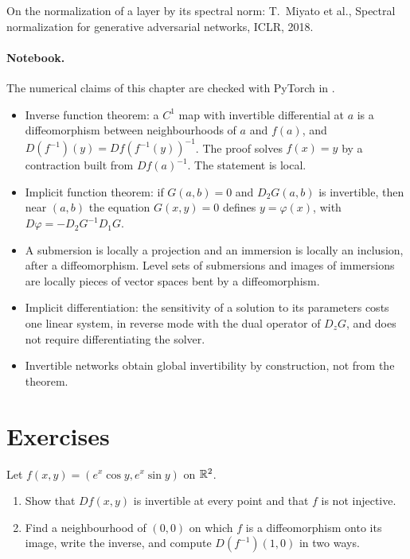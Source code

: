 \begin{notechapter}
On the normalization of a layer by its spectral norm: T.~Miyato et
al., Spectral normalization for generative adversarial networks, ICLR,
2018.

\paragraph{Notebook.} The numerical claims of this chapter are checked
with PyTorch in .

\begin{chaptersummary}
\begin{itemize}[nosep]
  \item Inverse function theorem: a $C^1$ map with invertible
        differential at $a$ is a diffeomorphism between neighbourhoods of
        $a$ and $f(a)$, and $D(f^{-1})(y) = Df(f^{-1}(y))^{-1}$. The proof
        solves $f(x) = y$ by a contraction built from $Df(a)^{-1}$. The
        statement is local.
  \item Implicit function theorem: if $G(a, b) = 0$ and $D_2G(a, b)$ is
        invertible, then near $(a, b)$ the equation $G(x, y) = 0$ defines
        $y = \varphi(x)$, with
        $D\varphi = -D_2G^{-1}D_1G$.
  \item A submersion is locally a projection and an immersion is locally
        an inclusion, after a diffeomorphism. Level sets of submersions
        and images of immersions are locally pieces of vector spaces bent
        by a diffeomorphism.
  \item Implicit differentiation: the sensitivity of a solution to its
        parameters costs one linear system, in reverse mode with the dual
        operator of $D_zG$, and does not require differentiating the
        solver.
  \item Invertible networks obtain global invertibility by construction,
        not from the theorem.
\end{itemize}
\end{chaptersummary}

\section*{Exercises}

\begin{exercise}\label{inverse-implicit:exr:1}
Let $f(x, y) = (e^x\cos y, e^x\sin y)$ on $\mathbb{R}^2$.
\begin{enumerate}[nosep]
  \item Show that $Df(x, y)$ is invertible at every point and that $f$ is
        not injective.
  \item Find a neighbourhood of $(0, 0)$ on which $f$ is a
        diffeomorphism onto its image, write the inverse, and compute
        $D(f^{-1})(1, 0)$ in two ways.
\end{enumerate}
\end{exercise}


\end{notechapter}

